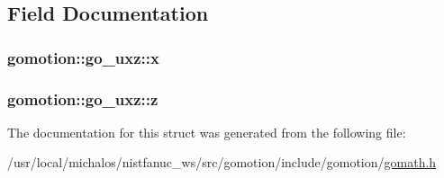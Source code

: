 \subsection{Field Documentation}
\hypertarget{structgomotion_1_1go__uxz_a1878a66236a43365991c4e4db1e5e518}{
\subsubsection[{x}]{ gomotion\-::go\-\_\-uxz\-::x}}\label{structgomotion_1_1go__uxz_a1878a66236a43365991c4e4db1e5e518}
\hypertarget{structgomotion_1_1go__uxz_a4c7bd45717e596a7a9331417d9bcfe83}{
\subsubsection[{z}]{ gomotion\-::go\-\_\-uxz\-::z}}\label{structgomotion_1_1go__uxz_a4c7bd45717e596a7a9331417d9bcfe83}


The documentation for this struct was generated from the following file\-:\begin{DoxyCompactItemize}
\item 
/usr/local/michalos/nistfanuc\-\_\-ws/src/gomotion/include/gomotion/\hyperlink{gomath_8h}{gomath.\-h}\end{DoxyCompactItemize}
